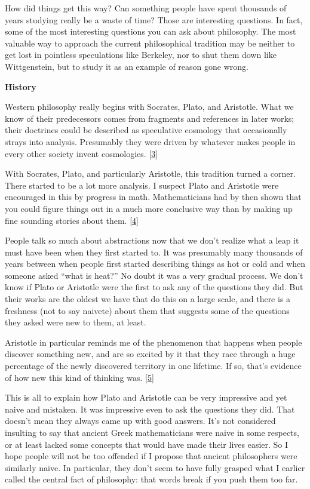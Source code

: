 How did things get this way? Can something people have spent thousands
of years studying really be a waste of time? Those are interesting
questions. In fact, some of the most interesting questions you can ask
about philosophy. The most valuable way to approach the current
philosophical tradition may be neither to get lost in pointless
speculations like Berkeley, nor to shut them down like Wittgenstein, but
to study it as an example of reason gone wrong.

\textbf{History}

Western philosophy really begins with Socrates, Plato, and Aristotle.
What we know of their predecessors comes from fragments and references
in later works; their doctrines could be described as speculative
cosmology that occasionally strays into analysis. Presumably they were
driven by whatever makes people in every other society invent
cosmologies. {[}\hyperref[f3n]{3}{]}

With Socrates, Plato, and particularly Aristotle, this tradition turned
a corner. There started to be a lot more analysis. I suspect Plato and
Aristotle were encouraged in this by progress in math. Mathematicians
had by then shown that you could figure things out in a much more
conclusive way than by making up fine sounding stories about them.
{[}\hyperref[f4n]{4}{]}

People talk so much about abstractions now that we don't realize what a
leap it must have been when they first started to. It was presumably
many thousands of years between when people first started describing
things as hot or cold and when someone asked ``what is heat?'' No doubt
it was a very gradual process. We don't know if Plato or Aristotle were
the first to ask any of the questions they did. But their works are the
oldest we have that do this on a large scale, and there is a freshness
(not to say naivete) about them that suggests some of the questions they
asked were new to them, at least.

Aristotle in particular reminds me of the phenomenon that happens when
people discover something new, and are so excited by it that they race
through a huge percentage of the newly discovered territory in one
lifetime. If so, that's evidence of how new this kind of thinking was.
{[}\hyperref[f5n]{5}{]}

This is all to explain how Plato and Aristotle can be very impressive
and yet naive and mistaken. It was impressive even to ask the questions
they did. That doesn't mean they always came up with good answers. It's
not considered insulting to say that ancient Greek mathematicians were
naive in some respects, or at least lacked some concepts that would have
made their lives easier. So I hope people will not be too offended if I
propose that ancient philosophers were similarly naive. In particular,
they don't seem to have fully grasped what I earlier called the central
fact of philosophy: that words break if you push them too far.

